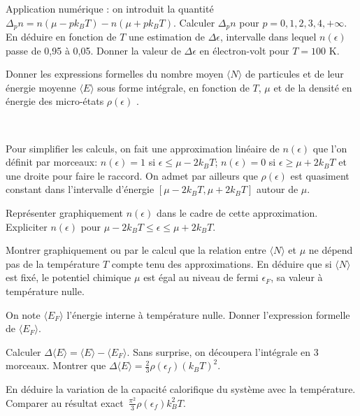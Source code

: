 \documentclass[utf8, 11pt]{feuille}
\begin{document}
\question Application numérique : on introduit la quantité $\Delta_p n=n(\mu-p k_BT)-n(\mu+p k_BT)$. Calculer $\Delta_p n$ pour $p=0, 1, 2, 3, 4, +\infty$. En déduire en fonction de $T$ une estimation de $\Delta \epsilon$, intervalle dans lequel $n(\epsilon)$ passe de 0,95 à 0,05. Donner la valeur de $\Delta \epsilon$ en électron-volt pour $T=100$ K.

\question Donner les expressions formelles du nombre moyen $\langle N \rangle$ de particules et de leur énergie moyenne $\langle E \rangle$ sous forme intégrale, en fonction de $T$, $\mu$ et de la densité en énergie des micro-états $\rho (\epsilon)$ .

\ 

Pour simplifier les calculs, on fait une approximation linéaire de $n(\epsilon)$ que l'on définit par morceaux: $n(\epsilon)=1$ si $\epsilon \le \mu-2 k_BT$; $n(\epsilon)=0$ si $\epsilon \ge \mu+2 k_BT$ et une droite pour faire le raccord. On admet par ailleurs que  $\rho(\epsilon)$ est quasiment constant dans l'intervalle d'énergie $[\mu-2 k_BT, \mu+2 k_BT]$ autour de $\mu$.

\question Représenter graphiquement $n(\epsilon)$ dans le cadre de cette approximation. Expliciter $n(\epsilon)$ pour $\mu-2 k_BT \le \epsilon \le \mu+2 k_BT$.

\question Montrer graphiquement ou par le calcul que la relation entre $\langle N \rangle$ et $\mu$ ne dépend pas de la température $T$ compte tenu des approximations. En déduire que si $\langle N \rangle$ est fixé, le potentiel chimique $\mu$ est égal au niveau de fermi $\epsilon_F$, sa valeur à température nulle.

\question On note $\langle E_F \rangle$ l'énergie interne à température nulle. Donner l'expression formelle de $\langle E_F \rangle$.

\question Calculer $\Delta \langle E \rangle =  \langle E \rangle-\langle E_F \rangle .$ Sans surprise, on découpera l'intégrale  en 3 morceaux. Montrer que \mbox{$\Delta \langle E \rangle =\frac{2}{3} \rho(\epsilon_f) (k_BT)^2$}.

\question En déduire la variation de la capacité calorifique du système avec la température. Comparer au résultat \mbox{exact $\frac{\pi^2}{3} \rho(\epsilon_f) k_B^2 T$}.

\end{document}
